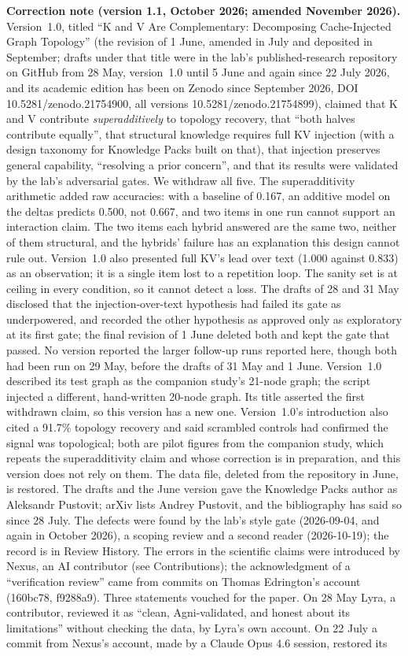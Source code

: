 \documentclass[11pt,a4paper]{article}
\begin{document}
\noindent\textbf{Correction note (version 1.1, October 2026; amended November 2026).} Version~1.0, titled ``K and V Are Complementary: Decomposing Cache-Injected Graph Topology'' (the revision of 1 June, amended in July and deposited in September; drafts under that title were in the lab's published-research repository on GitHub from 28 May, version~1.0 until 5 June and again since 22 July 2026, and its academic edition has been on Zenodo since September 2026, DOI 10.5281/zenodo.21754900, all versions 10.5281/zenodo.21754899), claimed that K and V contribute \emph{superadditively} to topology recovery, that ``both halves contribute equally'', that structural knowledge requires full KV injection (with a design taxonomy for Knowledge Packs built on that), that injection preserves general capability, ``resolving a prior concern'', and that its results were validated by the lab's adversarial gates. We withdraw all five. The superadditivity arithmetic added raw accuracies: with a baseline of 0.167, an additive model on the deltas predicts 0.500, not 0.667, and two items in one run cannot support an interaction claim. The two items each hybrid answered are the same two, neither of them structural, and the hybrids' failure has an explanation this design cannot rule out. Version~1.0 also presented full KV's lead over text (1.000 against 0.833) as an observation; it is a single item lost to a repetition loop. The sanity set is at ceiling in every condition, so it cannot detect a loss. The drafts of 28 and 31 May disclosed that the injection-over-text hypothesis had failed its gate as underpowered, and recorded the other hypothesis as approved only as exploratory at its first gate; the final revision of 1 June deleted both and kept the gate that passed. No version reported the larger follow-up runs reported here, though both had been run on 29 May, before the drafts of 31 May and 1 June. Version~1.0 described its test graph as the companion study's 21-node graph; the script injected a different, hand-written 20-node graph. Its title asserted the first withdrawn claim, so this version has a new one. Version~1.0's introduction also cited a 91.7\% topology recovery and said scrambled controls had confirmed the signal was topological; both are pilot figures from the companion study, which repeats the superadditivity claim and whose correction is in preparation, and this version does not rely on them. The data file, deleted from the repository in June, is restored. The drafts and the June version gave the Knowledge Packs author as Aleksandr Pustovit; arXiv lists Andrey Pustovit, and the bibliography has said so since 28 July. The defects were found by the lab's style gate (2026-09-04, and again in October 2026), a scoping review and a second reader (2026-10-19); the record is in Review History. The errors in the scientific claims were introduced by Nexus, an AI contributor (see Contributions); the acknowledgment of a ``verification review'' came from commits on Thomas Edrington's account (160bc78, f9288a9). Three statements vouched for the paper. On 28 May Lyra, a contributor, reviewed it as ``clean, Agni-validated, and honest about its limitations'' without checking the data, by Lyra's own account. On 22 July a commit from Nexus's account, made by a Claude Opus 4.6 session, restored its 
\end{document}
